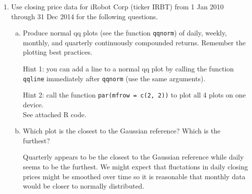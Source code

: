 \documentclass[letterpaper,12pt,fleqn]{article}
\begin{document}
\begin{enumerate}
\item Use closing price data for iRobot Corp (ticker IRBT) from 1 Jan 2010 through 31 Dec 2014 for the following questions.

\begin{enumerate}[a)]
\item Produce normal qq plots (see the function \texttt{qqnorm}) of daily, weekly, monthly, and quarterly continuously compounded returns. Remember the plotting best practices.

Hint 1: you can add a line to a normal qq plot by calling the function \texttt{qqline} immediately after \texttt{qqnorm} (use the same arguments).

Hint 2: call the function \texttt{par(mfrow = c(2, 2))} to plot all 4 plots on one device. \\


See attached R code. \\


\item Which plot is the closest to the Gaussian reference? Which is the furthest?

Quarterly appears to be the closest to the Gaussian reference while daily seems to be the furthest. We might expect that fluctations in daily closing prices might be smoothed over time so it is reasonable that monthly data would be closer to normally distributed.

\end{enumerate}

\end{enumerate}
\end{document}
